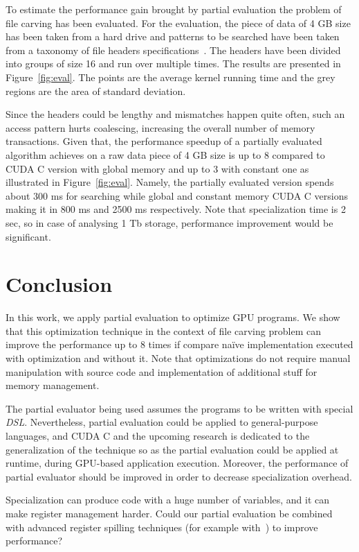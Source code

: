 \documentclass[sigplan]{acmart}\settopmatter{}
\begin{document}
To estimate the performance gain brought by partial evaluation the problem of file carving has been evaluated.
For the evaluation, the piece of data of 4 GB size has been taken from a hard drive and patterns to be searched have been taken from a taxonomy of file headers specifications~\cite{Headers}.
The headers have been divided into groups of size 16 and run over multiple times.
The results are presented in Figure~\ref{fig:eval}.
The points are the average kernel running time and the grey regions are the area of standard deviation.

Since the headers could be lengthy and mismatches happen quite often, such an access pattern hurts coalescing, increasing the overall number of memory transactions.
Given that, the performance speedup of a partially evaluated algorithm achieves on a raw data piece of 4 GB size is up to $8$ compared to CUDA C version with global memory and up to $3$ with constant one as illustrated in Figure~\ref{fig:eval}. Namely, the partially evaluated version spends about 300 ms for searching while global and constant memory CUDA C versions making it in 800 ms and 2500 ms respectively.
Note that specialization time is 2 sec, so in case of analysing 1 Tb storage, performance improvement would be significant.


\section{Conclusion}
In this work, we apply partial evaluation to optimize GPU programs.
We show that this optimization technique in the context of file carving problem can improve the performance up to $8$ times if compare na\"ive implementation executed with optimization and without it.
Note that optimizations do not require manual manipulation with source code and implementation of additional stuff for memory management.

The partial evaluator being used assumes the programs to be written with special \textit{DSL}.
Nevertheless, partial evaluation could be applied to general-purpose languages, and CUDA C and the upcoming research is dedicated to the generalization of the technique so as the partial evaluation could be applied at runtime, during GPU-based application execution.
Moreover, the performance of partial evaluator should be improved in order to decrease specialization overhead.

Specialization can produce code with a huge number of variables, and it can make register management harder.
Could our partial evaluation be combined with advanced register spilling techniques (for example with~\cite{Sakdhnagool2019RegDemIG}) to improve performance?
\end{document}
